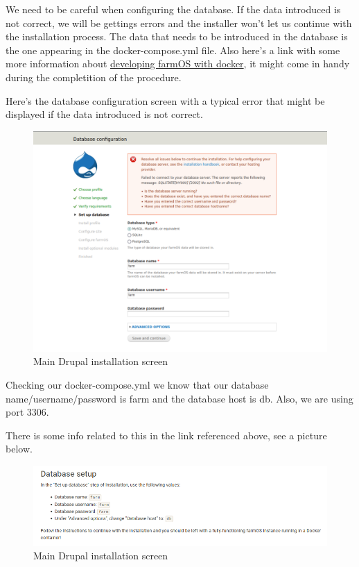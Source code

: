 We need to be careful when configuring the database. If the data introduced is not correct, we will be gettings errors and the installer won't let us continue with the installation process.
The data that needs to be introduced in the database is the one appearing in the docker-compose.yml file. Also here's a link with some more information about \href{https://farmos.org/development/docker/}{developing farmOS with docker}, it might come in handy during the completition of the procedure.

Here's the database configuration screen with a typical error that might be displayed if the data introduced is not correct.
\begin{figure}[H]
    \centering
    \includegraphics[width=1\textwidth]{fig/drupal-install/db-config-drupal.png}
    \caption{Main Drupal installation screen}
    \label{fig:db-config-drupal}
\end{figure}

Checking our docker-compose.yml we know that our database name/username/password is farm and the database host is db. Also, we are using port 3306.

There is some info related to this in the link referenced above, see a picture below.

\begin{figure}[H]
    \centering
    \includegraphics[width=1\textwidth]{fig/drupal-install/db-setup-tutorial.png}
    \caption{Main Drupal installation screen}
    \label{fig:db-setup-tutorial}
\end{figure}

